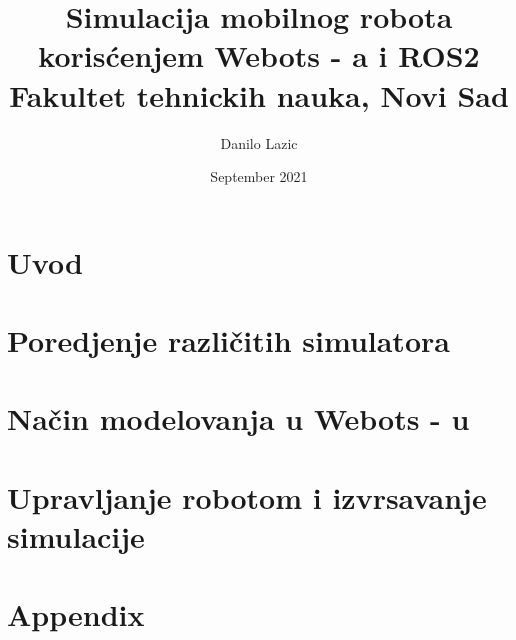 \documentclass[12pt,twoside]{report}
\title{
    {Simulacija mobilnog robota korisćenjem Webots - a i ROS2}\\
    {Fakultet tehnickih nauka, Novi Sad}\\  %
    }
\author{Danilo Lazic}
\date{September 2021}
\begin{document}
\maketitle

\tableofcontents
\newpage

\section{Uvod}

\newpage

\section{Poredjenje različitih simulatora}

\newpage

\section{Način modelovanja u Webots - u}

\newpage

\section{Upravljanje robotom i izvrsavanje simulacije}

\newpage

\appendix
\section{Appendix}


\printbibliography
\end{document}
